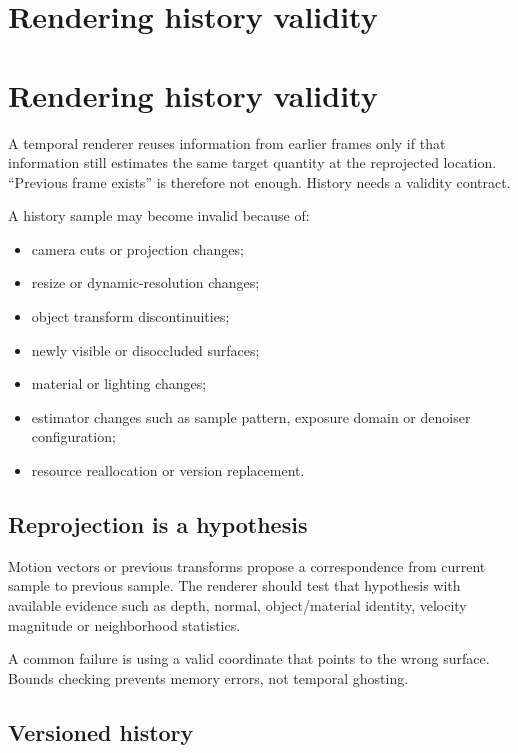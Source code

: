 \hypertarget{appendix-2e7e9fd28a2c}{}
\section*{Rendering history validity}
\section{Rendering history validity}\label{appendix-2e7e9fd28a2c-rendering-history-validity}

A temporal renderer reuses information from earlier frames only if that information still estimates the same target quantity at the reprojected location. ``Previous frame exists'' is therefore not enough. History needs a validity contract.

A history sample may become invalid because of:

\begin{itemize}
\tightlist
\item
  camera cuts or projection changes;
\item
  resize or dynamic-resolution changes;
\item
  object transform discontinuities;
\item
  newly visible or disoccluded surfaces;
\item
  material or lighting changes;
\item
  estimator changes such as sample pattern, exposure domain or denoiser configuration;
\item
  resource reallocation or version replacement.
\end{itemize}

\subsection{Reprojection is a hypothesis}\label{appendix-2e7e9fd28a2c-reprojection-is-a-hypothesis}

Motion vectors or previous transforms propose a correspondence from current sample to previous sample. The renderer should test that hypothesis with available evidence such as depth, normal, object/material identity, velocity magnitude or neighborhood statistics.

A common failure is using a valid coordinate that points to the wrong surface. Bounds checking prevents memory errors, not temporal ghosting.

\subsection{Versioned history}\label{appendix-2e7e9fd28a2c-versioned-history}

